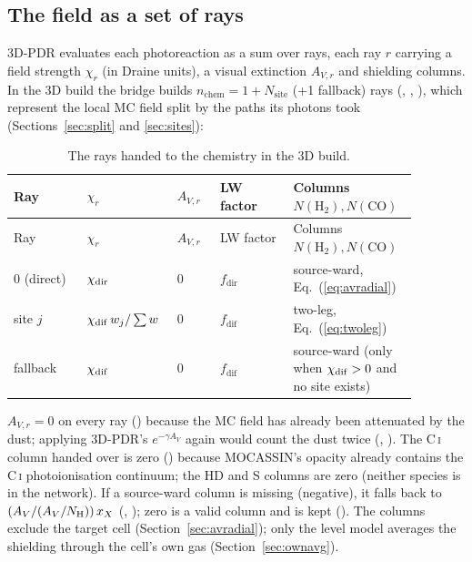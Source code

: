 \subsection{The field as a set of rays}
\label{sec:rays}

3D-PDR evaluates each photoreaction as a sum over rays, each ray $r$ carrying
a field strength $\chi_r$ (in Draine units), a visual extinction $A_{V,r}$ and
shielding columns. In the 3D build the bridge builds
$n_{\mathrm{chem}} = 1 + N_{\mathrm{site}}$ (+1 fallback) rays
(, , ), which
represent the local MC field split by the paths its photons took
(Sections~\ref{sec:split} and \ref{sec:sites}):

\begin{longtable}{@{}L{0.17\linewidth}L{0.20\linewidth}L{0.10\linewidth}L{0.17\linewidth}L{0.24\linewidth}@{}}
\caption{The rays handed to the chemistry in the 3D build.}\label{tab:rays}\\
\toprule
Ray & $\chi_r$ & $A_{V,r}$ & LW factor & Columns $N(\mathrm{H_2}),N(\mathrm{CO})$ \\
\midrule
\endfirsthead
\toprule
Ray & $\chi_r$ & $A_{V,r}$ & LW factor & Columns $N(\mathrm{H_2}),N(\mathrm{CO})$ \\
\midrule
{} (direct) & $\chi_{\mathrm{dir}}$ & 0 & $f_{\mathrm{dir}}$ & source-ward, Eq.~(\ref{eq:avradial}) \\
site $j$ & $\chi_{\mathrm{dif}}\,w_j/\sum w$ & 0 & $f_{\mathrm{dif}}$ & two-leg, Eq.~(\ref{eq:twoleg}) \\
fallback & $\chi_{\mathrm{dif}}$ & 0 & $f_{\mathrm{dif}}$ & source-ward (only when $\chi_{\mathrm{dif}}>0$ and no site exists) \\
\bottomrule
\end{longtable}

$A_{V,r}=0$ on every ray () because the MC field has already been
attenuated by the dust; applying 3D-PDR's $e^{-\gamma A_V}$ again would count
the dust twice (, ). The C\,\textsc{i} column handed
over is zero () because MOCASSIN's opacity already contains the
C\,\textsc{i} photoionisation continuum; the HD and S columns are zero
(neither species is in the network). If a source-ward column is missing
(negative), it falls back to $(A_{V}/(A_{V}/N_{\mathrm H}))\,x_X$
(, ); zero is a valid column and is kept
(). The columns exclude the target cell (Section~\ref{sec:avradial});
only the level model averages the shielding through the cell's own gas
(Section~\ref{sec:ownavg}).

